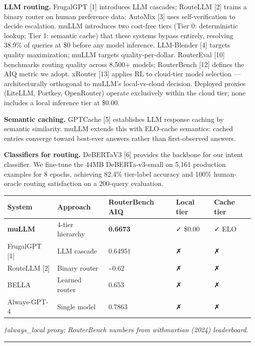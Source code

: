 \textbf{LLM routing.} FrugalGPT {[}1{]} introduces LLM cascades; RouteLLM {[}2{]} trains a binary router on human preference data; AutoMix {[}3{]} uses self-verification to decide escalation. muLLM introduces two cost-free tiers (Tier 0: deterministic lookup; Tier 1: semantic cache) that these systems bypass entirely, resolving 38.9\% of queries at \$0 before any model inference. LLM-Blender {[}4{]} targets quality maximization; muLLM targets quality-per-dollar. RouterEval {[}10{]} benchmarks routing quality across 8,500+ models; RouterBench {[}12{]} defines the AIQ metric we adopt. xRouter {[}13{]} applies RL to cloud-tier model selection --- architecturally orthogonal to muLLM's local-vs-cloud decision. Deployed proxies (LiteLLM, Portkey, OpenRouter) operate exclusively within the cloud tier; none includes a local inference tier at \$0.00.

\textbf{Semantic caching.} GPTCache {[}5{]} establishes LLM response caching by semantic similarity. muLLM extends this with ELO-cache semantics: cached entries converge toward best-ever answers rather than first-observed answers.

\textbf{Classifiers for routing.} DeBERTaV3 {[}6{]} provides the backbone for our intent classifier. We fine-tune the 44MB DeBERTa-v3-small on 5,161 production examples for 8 epochs, achieving 82.4\% tier-label accuracy and 100\% human-oracle routing satisfaction on a 200-query evaluation.

{\def\LTcaptype{none} %
\begin{longtable}[]{@{}lllll@{}}
\toprule\noalign{}
System & Approach & RouterBench AIQ & Local tier & Cache tier \\
\midrule\noalign{}
\endhead
\bottomrule\noalign{}
\endlastfoot
\textbf{muLLM} & 4-tier hierarchy & \textbf{0.6673} & ✓ \$0.00 & ✓ ELO \\
FrugalGPT {[}1{]} & LLM cascade & 0.6495† & ✗ & ✗ \\
RouteLLM {[}2{]} & Binary router & \textasciitilde0.62 & ✗ & ✗ \\
BELLA & Learned router & 0.653 & ✗ & ✗ \\
Always-GPT-4 & Single model & 0.7863 & ✗ & ✗ \\
\end{longtable}
}

\emph{†always\_local proxy; RouterBench numbers from withmartian (2024) leaderboard.}

\begin{center}\rule{0.5\linewidth}{0.5pt}\end{center}

